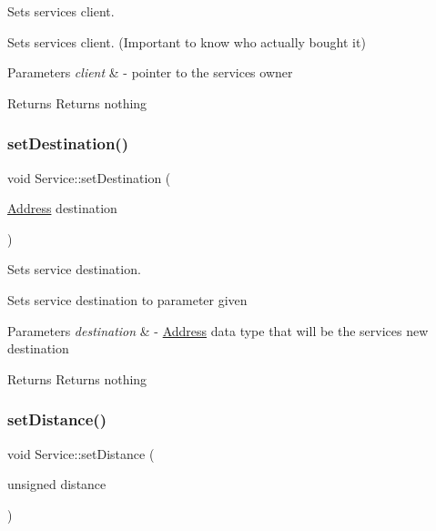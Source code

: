 Sets service\textquotesingle{}s client. 

Sets service\textquotesingle{}s client. (Important to know who actually bought it) 
\begin{DoxyParams}{Parameters}
{\em client} & -\/ pointer to the service\textquotesingle{}s owner \\
\hline
\end{DoxyParams}
\begin{DoxyReturn}{Returns}
Returns nothing 
\end{DoxyReturn}
\mbox{\label{class_service_a1c2082379deaf672919165e540afcab2}} 
\subsubsection{\texorpdfstring{set\+Destination()}{setDestination()}}
{\footnotesize\ttfamily void Service\+::set\+Destination (\begin{DoxyParamCaption}\item[{\hyperlink{class_address}{Address}}]{destination }\end{DoxyParamCaption})}



Sets service destination. 

Sets service destination to parameter given 
\begin{DoxyParams}{Parameters}
{\em destination} & -\/ \hyperlink{class_address}{Address} data type that will be the service\textquotesingle{}s new destination \\
\hline
\end{DoxyParams}
\begin{DoxyReturn}{Returns}
Returns nothing 
\end{DoxyReturn}
\mbox{\label{class_service_a6349774a4ab8afffe88dc51025690650}} 
\subsubsection{\texorpdfstring{set\+Distance()}{setDistance()}}
{\footnotesize\ttfamily void Service\+::set\+Distance (\begin{DoxyParamCaption}\item[{unsigned}]{distance }\end{DoxyParamCaption})}



